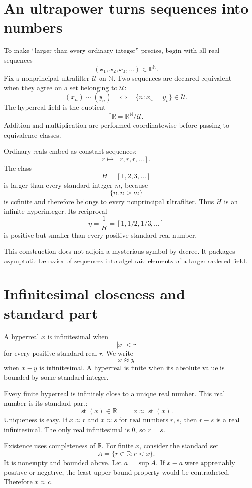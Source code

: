 \section{An ultrapower turns sequences into numbers}

To make “larger than every ordinary integer” precise, begin with all real sequences
\[
  (x_1,x_2,x_3,\ldots)\in\mathbb R^{\mathbb N}.
\]
Fix a nonprincipal ultrafilter \(\mathcal U\) on \(\mathbb N\).  Two sequences are declared equivalent when they agree on a set belonging to \(\mathcal U\):
\[
  (x_n)\sim(y_n)
  \quad\Longleftrightarrow\quad
  \{n:x_n=y_n\}\in\mathcal U.
\]
The hyperreal field is the quotient
\[
  {}^*\mathbb R=\mathbb R^{\mathbb N}/\mathcal U.
\]
Addition and multiplication are performed coordinatewise before passing to equivalence classes.

Ordinary reals embed as constant sequences:
\[
  r\longmapsto[r,r,r,\ldots].
\]
The class
\[
  H=[1,2,3,\ldots]
\]
is larger than every standard integer \(m\), because
\[
  \{n:n>m\}
\]
is cofinite and therefore belongs to every nonprincipal ultrafilter.  Thus \(H\) is an infinite hyperinteger.  Its reciprocal
\[
  \eta=\frac1H=[1,1/2,1/3,\ldots]
\]
is positive but smaller than every positive standard real number.

This construction does not adjoin a mysterious symbol by decree.  It packages asymptotic behavior of sequences into algebraic elements of a larger ordered field.

\section{Infinitesimal closeness and standard part}

A hyperreal \(x\) is infinitesimal when
\[
  |x|<r
\]
for every positive standard real \(r\).  We write
\[
  x\approx y
\]
when \(x-y\) is infinitesimal.  A hyperreal is finite when its absolute value is bounded by some standard integer.

Every finite hyperreal is infinitely close to a unique real number.  This real number is its standard part:
\[
  \operatorname{st}(x)\in\mathbb R,
  \qquad
  x\approx\operatorname{st}(x).
\]
Uniqueness is easy.  If \(x\approx r\) and \(x\approx s\) for real numbers \(r,s\), then \(r-s\) is a real infinitesimal.  The only real infinitesimal is \(0\), so \(r=s\).

Existence uses completeness of \(\mathbb R\).  For finite \(x\), consider the standard set
\[
  A=\{r\in\mathbb R:r<x\}.
\]
It is nonempty and bounded above.  Let \(a=\sup A\).  If \(x-a\) were appreciably positive or negative, the least-upper-bound property would be contradicted.  Therefore \(x\approx a\).

